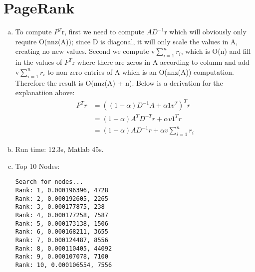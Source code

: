 \documentclass[a4paper,10pt]{article}
\begin{document}
\section{PageRank}
\begin{enumerate}[a)]
  \item To compute $P^{T}$r, first we need to compute $AD^{-1}$r which will obviously only require O(nnz(A)); since D is diagonal, it will only scale the values in A, creating no new values. Second we compute v$\sum_{i=1}^{n} r_{i}$, which is O(n) and fill in the values of $P^{T}$r where there are zeros in A according to column and add v$\sum_{i=1}^{n} r_{i}$ to non-zero entries of A which is an O(nnz(A)) computation. Therefore the result is O(nnz(A) + n). Below is a derivation for the explanatiion above:
    \begin{align}
      P^{T}r &= ((1-\alpha)D^{-1}A + \alpha1v^{T})^{T}r \\
      &=  (1-\alpha)A^{T}D^{-T}r + \alpha v 1^{T}r \\
      &= (1-\alpha)AD^{-1}r + \alpha v \sum_{i=1}^{n} r_{i}
      \label{}
    \end{align}
  \item Run time: 12.3s, Matlab 45s.
  \item Top 10 Nodes:
\begin{verbatim}
Search for nodes...
Rank: 1, 0.000196396, 4728
Rank: 2, 0.000192605, 2265
Rank: 3, 0.000177875, 238
Rank: 4, 0.000177258, 7587
Rank: 5, 0.000173138, 1506
Rank: 6, 0.000168211, 3655
Rank: 7, 0.000124487, 8556
Rank: 8, 0.000110405, 44092
Rank: 9, 0.000107078, 7100
Rank: 10, 0.000106554, 7556
\end{verbatim}
\end{enumerate}
\end{document}
